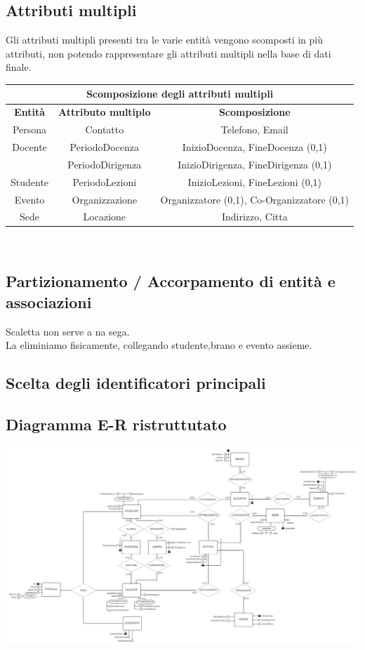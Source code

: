 \documentclass[11pt]{article}
\begin{document}
	\subsection{Attributi multipli}
		Gli attributi multipli presenti tra le varie entità vengono scomposti in più attributi, non potendo rappresentare gli attributi multipli nella base di dati finale.\\
		\begin{tabular}{|c|c|c|}
			\hline
			\multicolumn{3}{|c|}{Scomposizione degli attributi multipli}\\
			\hline
			\textbf{Entità} & \textbf{Attributo multiplo} & \textbf{Scomposizione}\\
			\hline
			Persona&Contatto&Telefono, Email\\
			\hline
			Docente&PeriodoDocenza&InizioDocenza, FineDocenza (0,1)\\
			&PeriodoDirigenza&InizioDirigenza, FineDirigenza (0,1)\\
			\hline
			Studente&PeriodoLezioni&InizioLezioni, FineLezioni (0,1)\\
			\hline
			Evento&Organizzazione&Organizzatore (0,1), Co-Organizzatore (0,1)\\
			\hline
			Sede&Locazione&Indirizzo, Citta\\
			\hline
		\end{tabular}\\
	\subsection{Partizionamento / Accorpamento di entità e associazioni}
		Scaletta non serve a na sega.\\
		La eliminiamo fisicamente, collegando studente,brano e evento assieme.
	\subsection{Scelta degli identificatori principali}
	\subsection{Diagramma E-R ristruttutato}
		\includegraphics[scale=0.55]{../SchemaConcettuale/ER-LUCIDCHART - ER-concettuale 2.jpeg}
\end{document}
